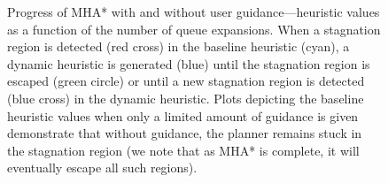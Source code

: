 \documentclass{article}
\begin{document}
\begin{figure}[t]%
  \centering%
%

  \caption{%
    Progress of MHA* with and without user guidance---heuristic values as a function of the number of queue expansions.
		When a stagnation region is detected (red cross) in the baseline heuristic (cyan), a dynamic heuristic is generated (blue) until the stagnation region is escaped (green circle) or until a new stagnation region is detected (blue cross) in the dynamic heuristic.
		Plots depicting the baseline heuristic values when only a limited amount of guidance is given demonstrate that without guidance, the planner remains stuck in the stagnation region (we note that as MHA* is complete, it will eventually escape all such regions).}


  \label{fig:h_plot}%

  \vspace{-4.5mm}

\end{figure}
\end{document}
